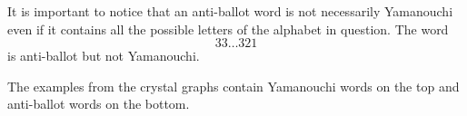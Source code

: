 \documentclass[12pt]{memoir}
\begin{document}
\begin{Rmk}
It is important to notice that an anti-ballot word is not necessarily Yamanouchi even if it contains all the possible letters of the alphabet in question. The word 
$$33\dots 321$$
is anti-ballot but not Yamanouchi.\par 
The examples from the crystal graphs contain Yamanouchi words on the top and anti-ballot words on the bottom.
\end{Rmk}
\end{document}
